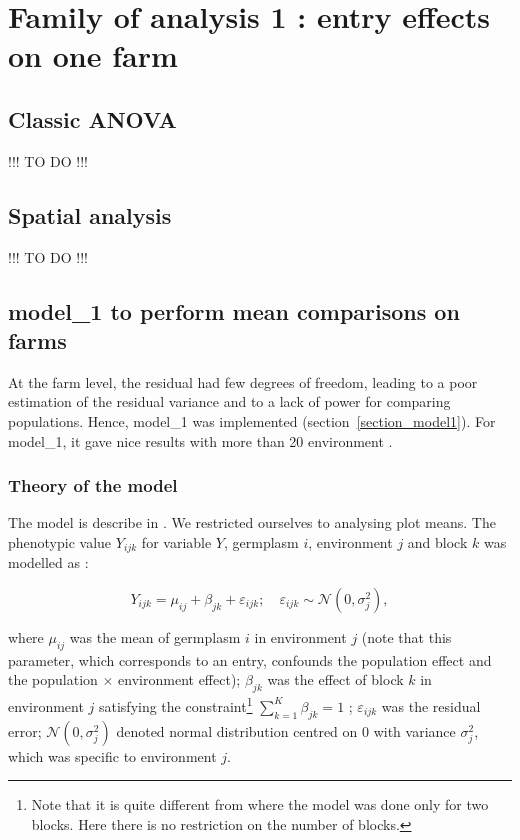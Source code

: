 \documentclass{article}\usepackage[]{graphicx}\usepackage[]{color}
\begin{document}
\newpage


\section{Family of analysis 1 : entry effects on one farm}
\label{section_analysis1}


\subsection{Classic ANOVA}
\label{classic_anova}

!!! TO DO !!!

\newpage


\subsection{Spatial analysis}
\label{spatial_analysis}


!!! TO DO !!!

\newpage


\subsection{model\_1 to perform mean comparisons on farms }
\label{model_1}

At the farm level, the residual had few degrees of freedom, leading to a poor estimation of the residual variance and to a lack of power for comparing populations.
Hence, model\_1 was implemented (section~\ref{section_model1}).
For model\_1, it gave nice results with more than 20 environment \citep{riviere_hierarchical_2015}.

\subsubsection{Theory of the model}

The model is describe in \citet{riviere_hierarchical_2015}.
We restricted ourselves to analysing plot means.
The phenotypic value $Y_{ijk}$ for variable $Y$, germplasm $i$, environment $j$ and block $k$ was modelled as :

\begin{equation}
	Y_{ijk} = \mu_{ij} + \beta_{jk} + \varepsilon_{ijk} ; \quad \varepsilon_{ijk} \sim \mathcal{N} (0,\sigma^2_{j}),
	\label{model1}
\end{equation}

where
$\mu_{ij}$ was the mean of germplasm $i$ in environment $j$ (note that this parameter, which corresponds to an entry, confounds the population effect and the population $\times$ environment effect);
$\beta_{jk}$ was the effect of block $k$ in environment $j$ satisfying the constraint\footnote{Note that it is quite different from \citet{riviere_hierarchical_2015} where the model was done only for two blocks. Here there is no restriction on the number of blocks.} $\sum\limits_{k=1}^K \beta_{jk} = 1$ ;
$\varepsilon_{ijk}$ was the residual error;
$\mathcal{N} (0,\sigma^2_{j})$ denoted normal distribution centred on 0 with variance $\sigma^2_{j}$, which was specific to environment $j$.
\end{document}
